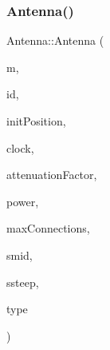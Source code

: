 \subsubsection{\texorpdfstring{Antenna()}{Antenna()}\hspace{0.1cm}{\footnotesize\ttfamily [1/2]}}
{\footnotesize\ttfamily Antenna\+::\+Antenna (\begin{DoxyParamCaption}\item[{const \mbox{\hyperlink{class_map}{Map}} $\ast$}]{m,  }\item[{const unsigned long}]{id,  }\item[{Point $\ast$}]{init\+Position,  }\item[{const \mbox{\hyperlink{class_clock}{Clock}} $\ast$}]{clock,  }\item[{double}]{attenuation\+Factor,  }\item[{double}]{power,  }\item[{unsigned long}]{max\+Connections,  }\item[{double}]{smid,  }\item[{double}]{ssteep,  }\item[{\mbox{\hyperlink{_antenna_type_8h_a7b678b5cb9dedc607131200119d96b16}{Antenna\+Type}}}]{type }\end{DoxyParamCaption})\hspace{0.3cm}{\ttfamily [explicit]}}

